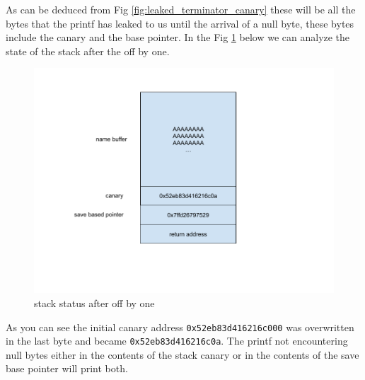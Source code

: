     As can be deduced from Fig \ref{fig:leaked_terminator_canary} these will be all the bytes that the printf has leaked to us until the arrival of a null byte, these bytes include the canary and the base pointer.\newline
    \clearpage
    In the Fig \ref{fig:stack terminator} below we can analyze the state of the stack after the off by one.\newline
    \begin{figure}[htbp]
        \centering
        \includegraphics[width=1\linewidth]{Images/draw_terminator_stack_canaryleak.png}
        \caption{stack status after off by one}
        \label{fig:stack terminator}
    \end{figure}
    
    As you can see the initial canary address \texttt{0x52eb83d416216c000}
    was overwritten in the last byte and became \texttt{0x52eb83d416216c0a}.\newline
    The printf not encountering null bytes either in the contents of the stack canary or in the contents of the save base pointer will print both.\newline
